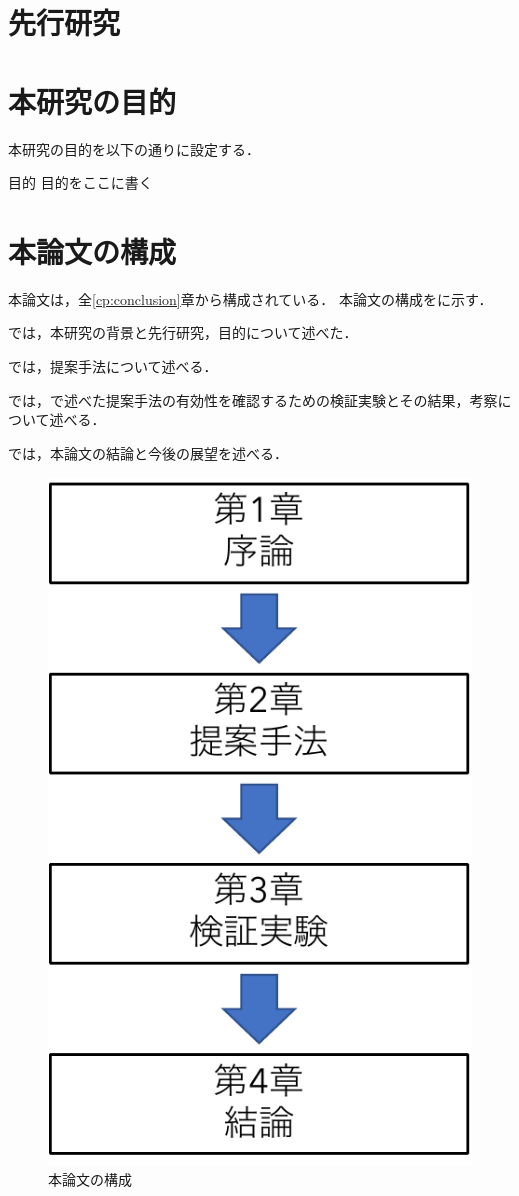 \documentclass[../main]{subfiles}
\begin{document}

\clearpage

\section{先行研究}
\label{sec:intro_previous-research}

\clearpage

\section{本研究の目的}
\label{sec:intro_my_purpose}

本研究の目的を以下の通りに設定する．


\bigskip
\begin{itembox}[c]{目的}
  \centering
  目的をここに書く
\end{itembox}


\clearpage

\section{本論文の構成}
\label{sec:configuration}

本論文は，全\ref{cp:conclusion}章から構成されている．
本論文の構成をに示す．

では，本研究の背景と先行研究，目的について述べた．

では，提案手法について述べる．

では，で述べた提案手法の有効性を確認するための検証実験とその結果，考察について述べる．

では，本論文の結論と今後の展望を述べる．

\vspace{3\zh}
\begin{figure}[h]
  \centering
  \includegraphics[keepaspectratio, width=0.35\linewidth]{chap1/configuration.pdf}
  \caption{本論文の構成}
  \label{fig:configuration}
\end{figure}

\clearpage
\end{document}
